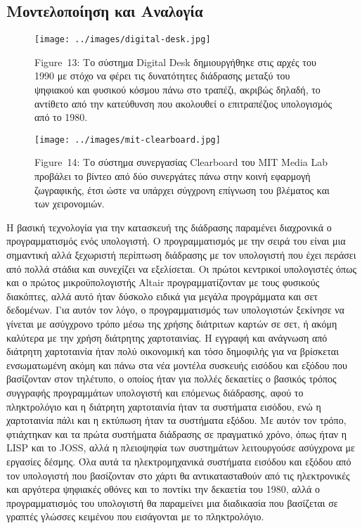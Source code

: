 \documentclass[
]{article}
\begin{document}
\hypertarget{ux3bcux3bfux3bdux3c4ux3b5ux3bbux3bfux3c0ux3bfux3afux3b7ux3c3ux3b7-ux3baux3b1ux3b9-ux3b1ux3bdux3b1ux3bbux3bfux3b3ux3afux3b1}{%
\subsection{Μοντελοποίηση και
Αναλογία}\label{ux3bcux3bfux3bdux3c4ux3b5ux3bbux3bfux3c0ux3bfux3afux3b7ux3c3ux3b7-ux3baux3b1ux3b9-ux3b1ux3bdux3b1ux3bbux3bfux3b3ux3afux3b1}}

\leavevmode{}%
\begin{figure}
\hypertarget{fig:digital-desk}{%
\centering
\texttt{[image: ../images/digital-desk.jpg]}
\caption{Figure~13: Το σύστημα Digital Desk δημιουργήθηκε στις αρχές του
1990 με στόχο να φέρει τις δυνατότητες διάδρασης μεταξύ του ψηφιακού και
φυσικού κόσμου πάνω στο τραπέζι, ακριβώς δηλαδή, το αντίθετο από την
κατεύθυνση που ακολουθεί ο επιτραπέζιος υπολογισμός από το
1980.}\label{fig:digital-desk}
}
\end{figure}

\leavevmode{}%
\begin{figure}
\hypertarget{fig:mit-clearboard}{%
\centering
\texttt{[image: ../images/mit-clearboard.jpg]}
\caption{Figure~14: Το σύστημα συνεργασίας Clearboard του MIT Media Lab
προβάλει το βίντεο από δύο συνεργάτες πάνω στην κοινή εφαρμογή
ζωγραφικής, έτσι ώστε να υπάρχει σύγχρονη επίγνωση του βλέματος και των
χειρονομιών.}\label{fig:mit-clearboard}
}
\end{figure}

Η βασική τεχνολογία για την κατασκευή της διάδρασης παραμένει διαχρονικά
ο προγραμματισμός ενός υπολογιστή. Ο προγραμματισμός με την σειρά του
είναι μια σημαντική αλλά ξεχωριστή περίπτωση διάδρασης με τον υπολογιστή
που έχει περάσει από πολλά στάδια και συνεχίζει να εξελίσεται. Οι πρώτοι
κεντρικοί υπολογιστές όπως και ο πρώτος μικροϋπολογιστής Altair
προγραμματίζονταν με τους φυσικούς διακόπτες, αλλά αυτό ήταν δύσκολο
ειδικά για μεγάλα προγράμματα και σετ δεδομένων. Για αυτόν τον λόγο, ο
προγραμματισμός των υπολογιστών ξεκίνησε να γίνεται με ασύγχρονο τρόπο
μέσω της χρήσης διάτριτων καρτών σε σετ, ή ακόμη καλύτερα με την χρήση
διάτρητης χαρτοταινίας. Η εγγραφή και ανάγνωση από διάτρητη χαρτοταινία
ήταν πολύ οικονομική και τόσο δημοφιλής για να βρίσκεται ενσωματωμένη
ακόμη και πάνω στα νέα μοντέλα συσκευής εισόδου και εξόδου που
βασίζονταν στον τηλέτυπο, ο οποίος ήταν για πολλές δεκαετίες ο βασικός
τρόπος συγγραφής προγραμμάτων υπολογιστή και επόμενως διάδρασης, αφού το
πληκτρολόγιο και η διάτρητη χαρτοταινία ήταν τα συστήματα εισόδου, ενώ η
χαρτοταινία πάλι και η εκτύπωση ήταν τα συστήματα εξόδου. Με αυτόν τον
τρόπο, φτιάχτηκαν και τα πρώτα συστήματα διάδρασης σε πραγματικό χρόνο,
όπως ήταν η LISP και το JOSS, αλλά η πλειοψηφία των συστημάτων
λειτουργούσε ασύγχρονα με εργασίες δέσμης. Όλα αυτά τα ηλεκτρομηχανικά
συστήματα εισόδου και εξόδου από τον υπολογιστή που βασίζονταν στο χάρτι
θα αντικατασταθούν από τις ηλεκτρονικές και αργότερα ψηφιακές οθόνες και
το ποντίκι την δεκαετία του 1980, αλλά ο προγραμματισμός του υπολογιστή
θα παραμείνει μια διαδικασία που βασίζεται σε γραπτές γλώσσες κειμένου
που εισάγονται με το πληκτρολόγιο.
\end{document}
